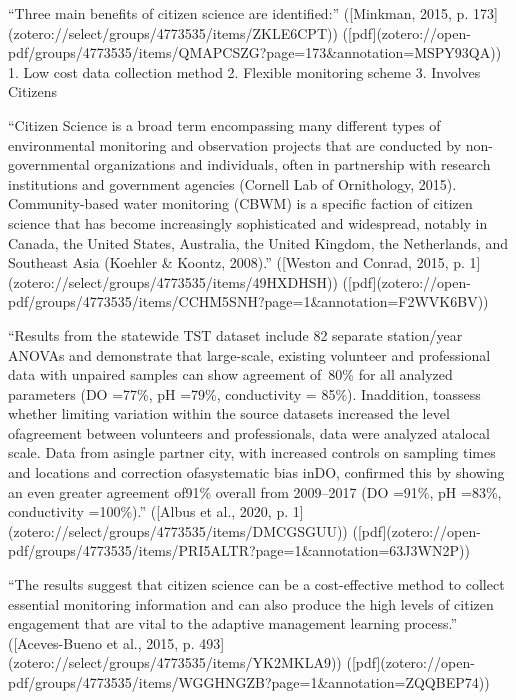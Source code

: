 {“Three main benefits of citizen science are identified:” ([Minkman, 2015, p. 173](zotero://select/groups/4773535/items/ZKLE6CPT)) ([pdf](zotero://open-pdf/groups/4773535/items/QMAPCSZG?page=173&annotation=MSPY93QA))
1. Low cost data collection method
2. Flexible monitoring scheme
3. Involves Citizens


“Citizen Science is a broad term encompassing many different types of environmental monitoring and observation projects that are conducted by non-governmental organizations and individuals, often in partnership with research institutions and government agencies (Cornell Lab of Ornithology, 2015). Community-based water monitoring (CBWM) is a specific faction of citizen science that has become increasingly sophisticated and widespread, notably in Canada, the United States, Australia, the United Kingdom, the Netherlands, and Southeast Asia (Koehler & Koontz, 2008).” ([Weston and Conrad, 2015, p. 1](zotero://select/groups/4773535/items/49HXDHSH)) ([pdf](zotero://open-pdf/groups/4773535/items/CCHM5SNH?page=1&annotation=F2WVK6BV))

“Results from the statewide TST dataset include 82 separate station/year ANOVAs and demonstrate that large-scale, existing volunteer and professional data with unpaired samples can show agreement of~80\% for all analyzed parameters (DO =77\%, pH =79\%, conductivity = 85\%). Inaddition, toassess whether limiting variation within the source datasets increased the level ofagreement between volunteers and professionals, data were analyzed atalocal scale. Data from asingle partner city, with increased controls on sampling times and locations and correction ofasystematic bias inDO, confirmed this by showing an even greater agreement of91\% overall from 2009–2017 (DO =91\%, pH =83\%, conductivity =100\%).” ([Albus et al., 2020, p. 1](zotero://select/groups/4773535/items/DMCGSGUU)) ([pdf](zotero://open-pdf/groups/4773535/items/PRI5ALTR?page=1\&annotation=63J3WN2P))

“The results suggest that citizen science can be a cost-effective method to collect essential monitoring information and can also produce the high levels of citizen engagement that are vital to the adaptive management learning process.” ([Aceves-Bueno et al., 2015, p. 493](zotero://select/groups/4773535/items/YK2MKLA9)) ([pdf](zotero://open-pdf/groups/4773535/items/WGGHNGZB?page=1&annotation=ZQQBEP74))


}
